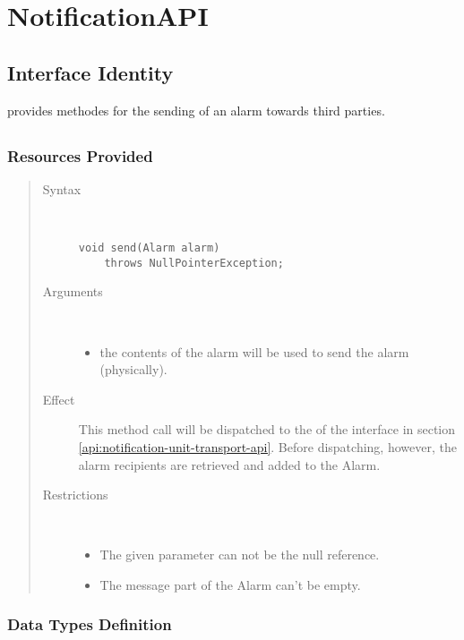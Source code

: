 \section{NotificationAPI}
\label{api:notifcation-api}

\subsection{Interface Identity}

\npar {} provides methodes for the sending of an alarm
towards third parties.

\subsection{}

\subsubsection{Resources Provided}

\begin{quote}
	\begin{description}
		\item[Syntax] \
		\begin{verbatim}
void send(Alarm alarm)
    throws NullPointerException;
		\end{verbatim}
		\item[Arguments] \
		\begin{itemize}
		  \item the contents of the alarm will be used to send the alarm (physically). 
		\end{itemize}
		\item[Effect] This method call will be dispatched to the 
		of the interface in section \ref{api:notification-unit-transport-api}. Before
		dispatching, however, the alarm recipients are retrieved and added to the
		Alarm.
		\item[Restrictions] \
		\begin{itemize}
		  \item The given parameter can not be the null reference.
		  \item The message part of the Alarm can't be empty.
		\end{itemize}
	\end{description} 
\end{quote}

\subsubsection{Data Types Definition}

